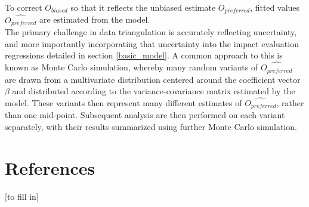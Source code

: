 \documentclass[twocolumn]{bmcart}%
\begin{document}
To correct $O_{biased}$ so that it reflects the unbiased estimate $O_{preferred}$, fitted values $\widehat{O_{preferred}}$ are estimated from the model. \\

The primary challenge in data triangulation is accurately reflecting uncertainty, and more importantly incorporating that uncertainty into the impact evaluation regressions detailed in section \ref{basic_model}. A common approach to this is known as Monte Carlo simulation, whereby many random variants of $\widehat{O_{preferred}}$ are drawn from a multivariate distribution centered around the coefficient vector $\beta$ and distributed according to the variance-covariance matrix estimated by the model. These variants then represent many different estimates of $\widehat{O_{preferred}}$, rather than one mid-point. Subsequent analysis are then performed on each variant separately, with their results summarized using further Monte Carlo simulation. \\



\section{References}
[to fill in] \\
\end{document}
